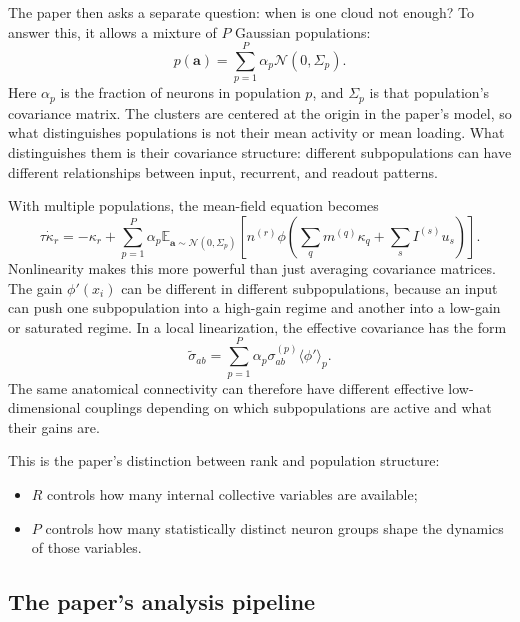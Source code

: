 \documentclass[11pt]{article}
\begin{document}
The paper then asks a separate question: when is one cloud not enough? To answer
this, it allows a mixture of $P$ Gaussian populations:
\begin{equation}
  p(\mathbf{a})
  =
  \sum_{p=1}^{P}
  \alpha_p \mathcal{N}(0,\Sigma_p).
  \label{eq:mixture_loading_gaussian}
\end{equation}
Here $\alpha_p$ is the fraction of neurons in population $p$, and $\Sigma_p$ is
that population's covariance matrix. The clusters are centered at the origin in
the paper's model, so what distinguishes populations is not their mean activity
or mean loading. What distinguishes them is their covariance structure: different
subpopulations can have different relationships between input, recurrent, and
readout patterns.

With multiple populations, the mean-field equation becomes
\begin{equation}
  \tau \dot{\kappa}_r
  =
  -\kappa_r
  +
  \sum_{p=1}^{P}\alpha_p
  \mathbb{E}_{\mathbf{a}\sim\mathcal{N}(0,\Sigma_p)}
  \left[
    n^{(r)}
    \phi\!\left(
      \sum_q m^{(q)}\kappa_q
      +
      \sum_s I^{(s)}u_s
    \right)
  \right].
  \label{eq:population_mean_field}
\end{equation}
Nonlinearity makes this more powerful than just averaging covariance matrices.
The gain $\phi'(x_i)$ can be different in different subpopulations, because an
input can push one subpopulation into a high-gain regime and another into a
low-gain or saturated regime. In a local linearization, the effective covariance
has the form
\begin{equation}
  \widetilde{\sigma}_{ab}
  =
  \sum_{p=1}^{P}
  \alpha_p
  \sigma_{ab}^{(p)}
  \langle \phi' \rangle_p.
  \label{eq:gain_weighted_covariance}
\end{equation}
The same anatomical connectivity can therefore have different effective
low-dimensional couplings depending on which subpopulations are active and what
their gains are.

This is the paper's distinction between rank and population structure:
\begin{itemize}
  \item $R$ controls how many internal collective variables are available;
  \item $P$ controls how many statistically distinct neuron groups shape the
  dynamics of those variables.
\end{itemize}

\subsection{The paper's analysis pipeline}
\end{document}

